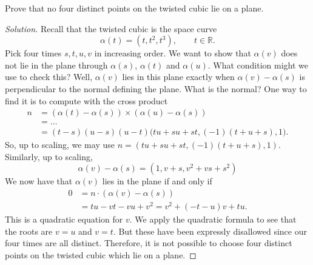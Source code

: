 \documentclass[Shifrin_Solutions_Spring_2018]{subfiles}
\begin{document}
\clearpage


\begin{exercise}
Prove that no four distinct points on the twisted cubic lie on a plane.
\end{exercise}

\begin{proof}[Solution]
Recall that the twisted cubic is the space curve
\[
\alpha(t) = (t,t^2, t^3), \qquad t \in \mathbb{R}.
\]
Pick four times $s,t,u,v$ in increasing order. We want to show that $\alpha(v)$ 
does not lie in the plane through $\alpha(s)$, $\alpha(t)$ and $\alpha(u)$. What 
condition might we use to check this?
Well, $\alpha(v)$ lies in this plane exactly when $\alpha(v)-\alpha(s)$ is 
perpendicular to the normal defining the plane. What is the normal? One way to 
find it is to compute with the cross product
\[
\begin{split}
n & = (\alpha(t)-\alpha(s)) \times (\alpha(u)-\alpha(s)) \\
	& = \dots \\
	& = (t-s)(u-s)(u-t) \Big( tu + su + st , (-1)(t + u + s) , 1 \Big) .
\end{split}
\]
So, up to scaling, we may use $n = ( tu + su + st, (-1)(t+u+s), 1) $. Similarly, 
up to scaling,
\[
\alpha(v) - \alpha(s) = (1, v+s , v^2 + vs + s^2 )
\]
We now have that $\alpha(v)$ lies in the plane if and only if
\[
\begin{split}
0 & = n \cdot (\alpha(v) - \alpha(s) ) \\
	& = tu - vt - vu + v^2   = v^2 + (-t-u) v + tu .
\end{split}
\]
This is a quadratic equation for $v$. We apply the quadratic formula to see that 
the roots are $v = u$ and $v= t$. But these have been expressly disallowed since 
our four times are all distinct. Therefore, it is not possible to choose four distinct 
points on the twisted cubic which lie on a plane.
\end{proof}

\clearpage

\end{document}
